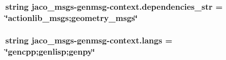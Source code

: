 \subsubsection[{\texorpdfstring{dependencies\+\_\+str}{dependencies_str}}]{\setlength{\rightskip}{0pt plus 5cm}string jaco\+\_\+msgs-\/genmsg-\/context.\+dependencies\+\_\+str = \char`\"{}actionlib\+\_\+msgs;geometry\+\_\+msgs\char`\"{}}\hypertarget{namespacejaco__msgs-genmsg-context_a13566f29eee7e302ea703274056230d0}{}\label{namespacejaco__msgs-genmsg-context_a13566f29eee7e302ea703274056230d0}
\subsubsection[{\texorpdfstring{langs}{langs}}]{\setlength{\rightskip}{0pt plus 5cm}string jaco\+\_\+msgs-\/genmsg-\/context.\+langs = \char`\"{}gencpp;genlisp;genpy\char`\"{}}\hypertarget{namespacejaco__msgs-genmsg-context_a3a7105aa3a2c51a1310d64f75f399733}{}\label{namespacejaco__msgs-genmsg-context_a3a7105aa3a2c51a1310d64f75f399733}
